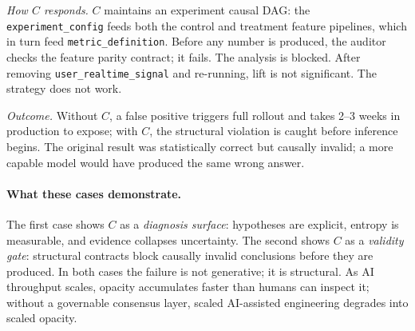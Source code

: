 \textit{How $C$ responds.} $C$ maintains an experiment causal DAG: the \texttt{experiment\_config} feeds both the control and treatment feature pipelines, which in turn feed \texttt{metric\_definition}.
Before any number is produced, the auditor checks the feature parity contract; it fails.
The analysis is blocked. After removing \texttt{user\_realtime\_signal} and re-running, lift is not significant. The strategy does not work.

\textit{Outcome.} Without $C$, a false positive triggers full rollout and takes 2--3 weeks in production to expose; with $C$, the structural violation is caught before inference begins.
The original result was statistically correct but causally invalid; a more capable model would have produced the same wrong answer.

\paragraph{What these cases demonstrate.}
The first case shows $C$ as a \emph{diagnosis surface}: hypotheses are explicit, entropy is measurable, and evidence collapses uncertainty.
The second shows $C$ as a \emph{validity gate}: structural contracts block causally invalid conclusions before they are produced.
In both cases the failure is not generative; it is structural. As AI throughput scales, opacity accumulates faster than humans can inspect it; without a governable consensus layer, scaled AI-assisted engineering degrades into scaled opacity.
